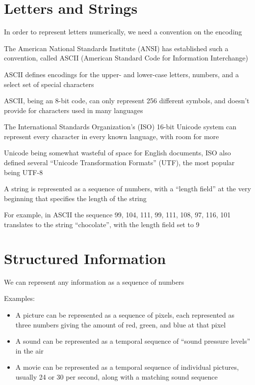 \documentclass[8pt,a4paper,compress]{beamer}
\begin{document}
\section{Letters and Strings}
\begin{frame}[fragile]
In order to represent letters numerically, we need a convention on the encoding

\bigskip

The American National Standards Institute (ANSI) has established such a convention, called ASCII (American Standard Code for Information Interchange)

\bigskip

ASCII defines encodings for the upper- and lower-case letters, numbers, and a select set of special characters

\bigskip

ASCII, being an 8-bit code, can only represent 256 different symbols, and doesn't provide for characters used in many languages

\bigskip

The International Standards Organization's (ISO) 16-bit Unicode system can represent every character in every known language, with room for more

\bigskip

Unicode being somewhat wasteful of space for English documents, ISO also defined several ``Unicode Transformation Formats'' (UTF), the most popular being UTF-8 
\end{frame}

\begin{frame}[fragile]
A string is represented as a sequence of numbers, with a ``length field'' at the very beginning that specifies the length of the string

\bigskip

For example, in ASCII the sequence 99, 104, 111, 99, 111, 108, 97, 116, 101 translates to the string ``chocolate'', with the length field set to 9
\end{frame}

\section{Structured Information}
\begin{frame}[fragile]
We can represent any information as a sequence of numbers

\bigskip

Examples: 
\begin{itemize}
\item A picture can be represented as a sequence of pixels, each represented as three numbers giving the amount of red, green, and blue at that pixel

\item A sound can be represented as a temporal sequence of ``sound pressure levels'' in the air

\item A movie can be represented as a temporal sequence of individual pictures, usually 24 or 30 per second, along with a matching sound sequence
\end{itemize}
\end{frame}
\end{document}
